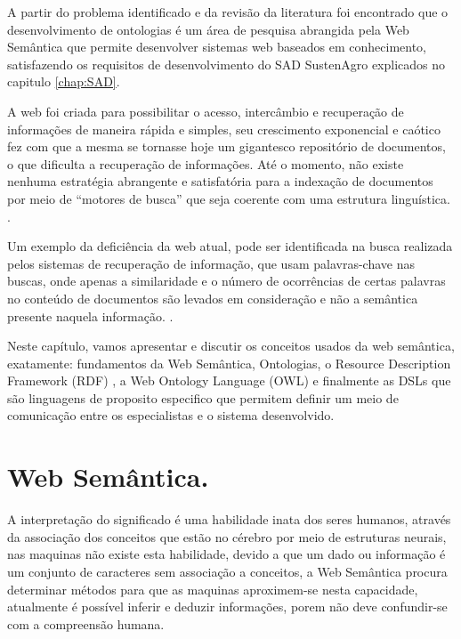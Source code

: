 A partir do problema identificado e da revisão da literatura foi encontrado
que o desenvolvimento de ontologias é um área de pesquisa abrangida
pela Web Semântica que permite desenvolver sistemas web baseados em
conhecimento, satisfazendo os requisitos de desenvolvimento do SAD
SustenAgro explicados no capitulo \ref{chap:SAD}.

A web foi criada para possibilitar o acesso, intercâmbio e recuperação
de informações de maneira rápida e simples, seu crescimento exponencial
e caótico fez com que a mesma se tornasse hoje um gigantesco repositório
de documentos, o que dificulta a recuperação de informações. Até o
momento, não existe nenhuma estratégia abrangente e satisfatória para
a indexação de documentos por meio de “motores de busca” que seja
coerente com uma estrutura linguística. \citet{Souza:2004}.

Um exemplo da deficiência da web atual, pode ser identificada na busca
realizada pelos sistemas de recuperação de informação, que usam palavras-chave
nas buscas, onde apenas a similaridade e o número de ocorrências de
certas palavras no conteúdo de documentos são levados em consideração
e não a semântica presente naquela informação. \citep{Souza:2004}.

Neste capítulo, vamos apresentar e discutir os conceitos usados da
web semântica, exatamente: fundamentos da Web Semântica, Ontologias,
o \foreignlanguage{english}{Resource Description Framework (RDF)}
, a \foreignlanguage{english}{Web
Ontology Language} (\foreignlanguage{english}{OWL})
e finalmente as \foreignlanguage{english}{DSLs}
que são linguagens de proposito especifico que permitem definir um
meio de comunicação entre os especialistas e o sistema desenvolvido.

\section{Web Semântica.}

A interpretação do significado é uma habilidade inata dos seres humanos,
através da associação dos conceitos que estão no cérebro por meio
de estruturas neurais, nas maquinas não existe esta habilidade, devido
a que um dado ou informação é um conjunto de caracteres sem associação
a conceitos, a Web Semântica procura determinar métodos para que as
maquinas aproximem-se nesta capacidade, atualmente é possível inferir
e deduzir informações, porem não deve confundir-se com a compreensão
humana.

